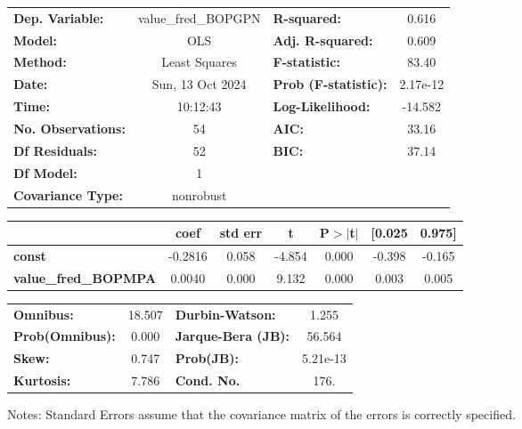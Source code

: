 \begin{center}
\begin{tabular}{lclc}
\toprule
\textbf{Dep. Variable:}      & value\_fred\_BOPGPN & \textbf{  R-squared:         } &     0.616   \\
\textbf{Model:}              &         OLS         & \textbf{  Adj. R-squared:    } &     0.609   \\
\textbf{Method:}             &    Least Squares    & \textbf{  F-statistic:       } &     83.40   \\
\textbf{Date:}               &   Sun, 13 Oct 2024  & \textbf{  Prob (F-statistic):} &  2.17e-12   \\
\textbf{Time:}               &       10:12:43      & \textbf{  Log-Likelihood:    } &   -14.582   \\
\textbf{No. Observations:}   &            54       & \textbf{  AIC:               } &     33.16   \\
\textbf{Df Residuals:}       &            52       & \textbf{  BIC:               } &     37.14   \\
\textbf{Df Model:}           &             1       & \textbf{                     } &             \\
\textbf{Covariance Type:}    &      nonrobust      & \textbf{                     } &             \\
\bottomrule
\end{tabular}
\begin{tabular}{lcccccc}
                             & \textbf{coef} & \textbf{std err} & \textbf{t} & \textbf{P$> |$t$|$} & \textbf{[0.025} & \textbf{0.975]}  \\
\midrule
\textbf{const}               &      -0.2816  &        0.058     &    -4.854  &         0.000        &       -0.398    &       -0.165     \\
\textbf{value\_fred\_BOPMPA} &       0.0040  &        0.000     &     9.132  &         0.000        &        0.003    &        0.005     \\
\bottomrule
\end{tabular}
\begin{tabular}{lclc}
\textbf{Omnibus:}       & 18.507 & \textbf{  Durbin-Watson:     } &    1.255  \\
\textbf{Prob(Omnibus):} &  0.000 & \textbf{  Jarque-Bera (JB):  } &   56.564  \\
\textbf{Skew:}          &  0.747 & \textbf{  Prob(JB):          } & 5.21e-13  \\
\textbf{Kurtosis:}      &  7.786 & \textbf{  Cond. No.          } &     176.  \\
\bottomrule
\end{tabular}
\end{center}

Notes: \newline
 [1] Standard Errors assume that the covariance matrix of the errors is correctly specified.